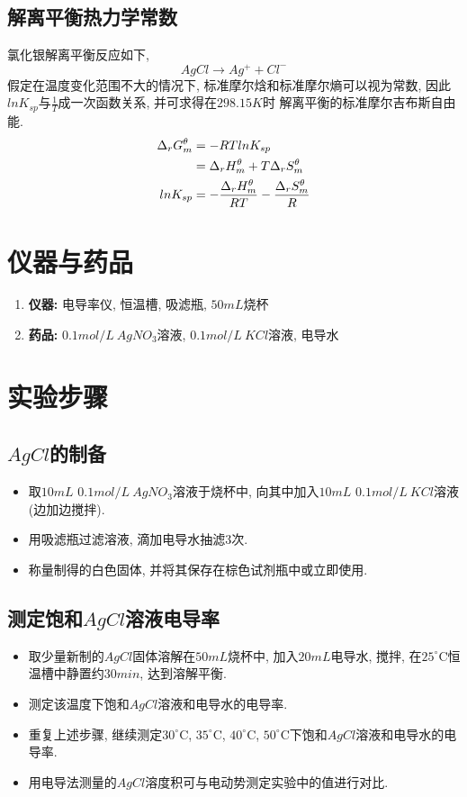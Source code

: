 \documentclass[a4paper]{article}
\begin{document}
\subsection{解离平衡热力学常数}
氯化银解离平衡反应如下, 
\begin{equation}
	AgCl \to Ag^{+} + Cl^{-}
\end{equation}
假定在温度变化范围不大的情况下, 标准摩尔焓和标准摩尔熵可以视为常数, 
因此$lnK_{sp}$与$\frac{1}{T}$成一次函数关系, 并可求得在$298.15K$时
解离平衡的标准摩尔吉布斯自由能.
\begin{equation}
	\centering
	\begin{aligned}
		\Delta_{r}G_{m}^{\theta} &= -RTlnK_{sp}\\
		&=\Delta_{r}H_{m}^{\theta} + T\Delta_{r}S_{m}^{\theta}\\
		lnK_{sp} &= -\frac{\Delta_{r}H_{m}^{\theta}}{RT} - \frac{\Delta_{r}S_{m}^{\theta}}{R}\\
	\end{aligned}
\end{equation}
\section{仪器与药品}
\begin{enumerate}
    \item \textbf{仪器:} 电导率仪, 恒温槽, 吸滤瓶, $50mL$烧杯
    \item \textbf{药品:} $0.1mol/L~AgNO_{3}$溶液, $0.1mol/L~KCl$溶液, 电导水
\end{enumerate}
\section{实验步骤}
\subsection{$AgCl$的制备}
\begin{itemize}
	\item 取$10mL$ $0.1mol/L~AgNO_{3}$溶液于烧杯中, 
	向其中加入$10mL$ $0.1mol/L~KCl$溶液(边加边搅拌).
	\item 用吸滤瓶过滤溶液, 滴加电导水抽滤3次. 
	\item 称量制得的白色固体, 并将其保存在棕色试剂瓶中或立即使用.
\end{itemize}
\subsection{测定饱和$AgCl$溶液电导率}
\begin{itemize}
	\item 取少量新制的$AgCl$固体溶解在$50mL$烧杯中, 加入$20mL$电导水, 
	搅拌, 在$25^\circ$C恒温槽中静置约$30min$, 达到溶解平衡.
	\item 测定该温度下饱和$AgCl$溶液和电导水的电导率. 
	\item 重复上述步骤, 继续测定$30^\circ$C, $35^\circ$C, $40^\circ$C, 
	$50^\circ$C下饱和$AgCl$溶液和电导水的电导率.
	\item 用电导法测量的$AgCl$溶度积可与电动势测定实验中的值进行对比.
\end{itemize}
\newpage
\end{document}
